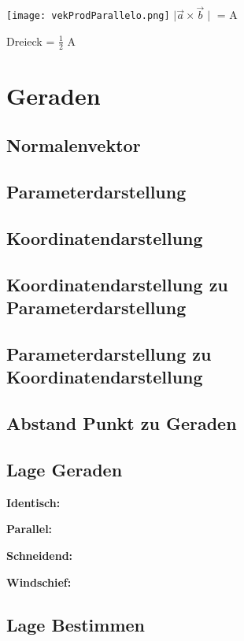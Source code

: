 \begin{multicols*}{3}
\texttt{[image: vekProdParallelo.png]}
{ $\mid \vec{a} \times \vec{b} \mid $ = A }

{Dreieck = $\frac{1}{2}$ A}

\WhiteSpace


\section{Geraden}
\subsection{Normalenvektor}

\subsection{Parameterdarstellung}

\subsection{Koordinatendarstellung}

\subsection{Koordinatendarstellung zu Parameterdarstellung }

\subsection{Parameterdarstellung zu Koordinatendarstellung}

\subsection{Abstand Punkt zu Geraden}

\subsection{Lage Geraden}

\textbf{Identisch:}  

\textbf{Parallel:} 

\textbf{Schneidend:}

\textbf{Windschief:} 

\subsection{Lage Bestimmen}



\end{multicols*}
